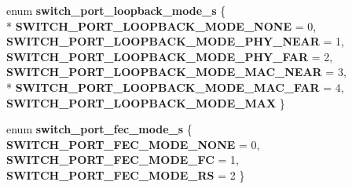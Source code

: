 \begin{DoxyCompactItemize}
\item 
\hypertarget{group__Port_gabb078780496ff52dc4d5e557cd07fa69}{enum {\bfseries switch\+\_\+port\+\_\+loopback\+\_\+mode\+\_\+s} \{ \\*
{\bfseries S\+W\+I\+T\+C\+H\+\_\+\+P\+O\+R\+T\+\_\+\+L\+O\+O\+P\+B\+A\+C\+K\+\_\+\+M\+O\+D\+E\+\_\+\+N\+O\+N\+E} = 0, 
{\bfseries S\+W\+I\+T\+C\+H\+\_\+\+P\+O\+R\+T\+\_\+\+L\+O\+O\+P\+B\+A\+C\+K\+\_\+\+M\+O\+D\+E\+\_\+\+P\+H\+Y\+\_\+\+N\+E\+A\+R} = 1, 
{\bfseries S\+W\+I\+T\+C\+H\+\_\+\+P\+O\+R\+T\+\_\+\+L\+O\+O\+P\+B\+A\+C\+K\+\_\+\+M\+O\+D\+E\+\_\+\+P\+H\+Y\+\_\+\+F\+A\+R} = 2, 
{\bfseries S\+W\+I\+T\+C\+H\+\_\+\+P\+O\+R\+T\+\_\+\+L\+O\+O\+P\+B\+A\+C\+K\+\_\+\+M\+O\+D\+E\+\_\+\+M\+A\+C\+\_\+\+N\+E\+A\+R} = 3, 
\\*
{\bfseries S\+W\+I\+T\+C\+H\+\_\+\+P\+O\+R\+T\+\_\+\+L\+O\+O\+P\+B\+A\+C\+K\+\_\+\+M\+O\+D\+E\+\_\+\+M\+A\+C\+\_\+\+F\+A\+R} = 4, 
{\bfseries S\+W\+I\+T\+C\+H\+\_\+\+P\+O\+R\+T\+\_\+\+L\+O\+O\+P\+B\+A\+C\+K\+\_\+\+M\+O\+D\+E\+\_\+\+M\+A\+X}
 \}}\label{group__Port_gabb078780496ff52dc4d5e557cd07fa69}

\item 
\hypertarget{group__Port_ga8a7257270b607874f50acbf967b98372}{enum {\bfseries switch\+\_\+port\+\_\+fec\+\_\+mode\+\_\+s} \{ {\bfseries S\+W\+I\+T\+C\+H\+\_\+\+P\+O\+R\+T\+\_\+\+F\+E\+C\+\_\+\+M\+O\+D\+E\+\_\+\+N\+O\+N\+E} = 0, 
{\bfseries S\+W\+I\+T\+C\+H\+\_\+\+P\+O\+R\+T\+\_\+\+F\+E\+C\+\_\+\+M\+O\+D\+E\+\_\+\+F\+C} = 1, 
{\bfseries S\+W\+I\+T\+C\+H\+\_\+\+P\+O\+R\+T\+\_\+\+F\+E\+C\+\_\+\+M\+O\+D\+E\+\_\+\+R\+S} = 2
 \}}\label{group__Port_ga8a7257270b607874f50acbf967b98372}

\end{DoxyCompactItemize}
